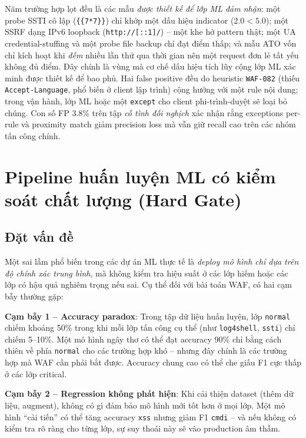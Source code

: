 \documentclass[../DoAn.tex]{subfiles}
\begin{document}
Năm trường hợp lọt đều là các mẫu \textit{được thiết kế để lớp ML đảm nhận}:
một probe SSTI cô lập (\texttt{\{\{7*7\}\}}) chỉ khớp một dấu hiệu indicator
(\(2.0 < 5.0\)); một SSRF dạng IPv6 loopback (\texttt{http://[::1]/}) -- một
khe hở pattern thật; một UA credential-stuffing và một probe file backup chỉ
đạt điểm thấp; và mẫu ATO vốn chỉ kích hoạt khi \textit{đếm} nhiều lần thử qua
thời gian nên một request đơn lẻ tất yếu không đủ điểm. Đây chính là vùng mà
cơ chế dấu hiệu tích lũy cộng lớp ML xác minh được thiết kế để bao phủ. Hai
false positive đều do heuristic \texttt{WAF-082} (thiếu \texttt{Accept-Language},
phổ biến ở client lập trình) cộng hưởng với một rule nội dung; trong vận hành,
lớp ML hoặc một \texttt{except} cho client phi-trình-duyệt sẽ loại bỏ chúng.
Con số FP 3.8\% trên tập \textit{cố tình đối nghịch} xác nhận rằng exceptions
per-rule và proximity match giảm precision loss mà vẫn giữ recall cao trên các
nhóm tấn công chính.

\section{Pipeline huấn luyện ML có kiểm soát chất lượng (Hard Gate)}
\label{section:5.3}

\subsection{Đặt vấn đề}
\label{subsection:5.3.1}

Một sai lầm phổ biến trong các dự án ML thực tế là \textit{deploy mô hình
chỉ dựa trên độ chính xác trung bình}, mà không kiểm tra hiệu suất ở các
lớp hiếm hoặc các lớp có hậu quả nghiêm trọng nếu sai. Cụ thể đối với bài
toán WAF, có hai cạm bẫy thường gặp:

\textbf{Cạm bẫy 1 -- Accuracy paradox}: Trong tập dữ liệu huấn luyện, lớp
\texttt{normal} chiếm khoảng 50\% trong khi mỗi lớp tấn công cụ thể (như
\texttt{log4shell}, \texttt{ssti}) chỉ chiếm 5--10\%. Một mô hình ngây thơ
có thể đạt accuracy 90\% chỉ bằng cách thiên về phía \texttt{normal} cho
các trường hợp khó -- nhưng đây chính là các trường hợp mà WAF cần phải
bắt được. Accuracy chung cao có thể che giấu F1 cực thấp ở các lớp critical.

\textbf{Cạm bẫy 2 -- Regression không phát hiện}: Khi cải thiện dataset
(thêm dữ liệu, augment), không có gì đảm bảo mô hình mới tốt hơn ở mọi
lớp. Một mô hình ``cải tiến'' có thể tăng accuracy \texttt{xss} nhưng
giảm F1 \texttt{cmdi} -- và nếu không có kiểm tra rõ ràng cho từng lớp,
sự suy thoái này sẽ vào production âm thầm.
\end{document}
